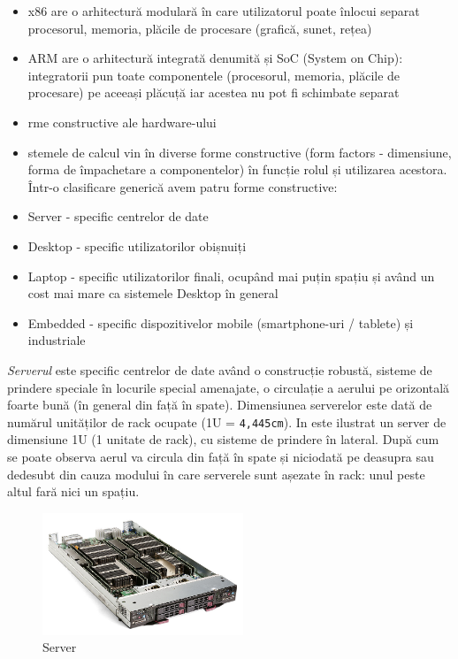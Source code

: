 \begin{itemize}
	\item x86 are o arhitectură modulară în care utilizatorul poate înlocui
		separat procesorul, memoria, plăcile de procesare (grafică,
		sunet, rețea)
	\item ARM are o arhitectură integrată denumită și SoC (System on Chip):
		integratorii pun toate componentele (procesorul, memoria,
		plăcile de procesare) pe aceeași plăcuță iar acestea nu pot fi
		schimbate separat
	\item rme constructive ale hardware-ului
	\item stemele de calcul vin în diverse forme constructive (form factors
		- dimensiune, forma de împachetare a componentelor) în funcție
		rolul și utilizarea acestora. Într-o clasificare generică avem
		patru forme constructive:
	\item Server - specific centrelor de date
	\item Desktop - specific utilizatorilor obișnuiți
	\item Laptop - specific utilizatorilor finali, ocupând mai puțin spațiu
		și având un cost mai mare ca sistemele Desktop în general
	\item Embedded - specific dispozitivelor mobile (smartphone-uri /
		tablete) și industriale
\end{itemize}

\textit{Serverul} este specific centrelor de date având o construcție robustă,
sisteme de prindere speciale în locurile special amenajate, o circulație a
aerului pe orizontală foarte bună (în general din față în spate). Dimensiunea
serverelor este dată de numărul unităților de rack ocupate (1U = \texttt{4,445cm}). In
 este ilustrat un server de dimensiune 1U
(1 unitate de rack), cu sisteme de prindere în lateral. După cum se poate
observa aerul va circula din față în spate și niciodată pe deasupra sau dedesubt
din cauza modului în care serverele sunt așezate în rack: unul peste altul fară
nici un spațiu.

\begin{figure}[!htbp]
	\centering
	\includegraphics[width=6cm]{chapters/08-hw/img/server-img.png}
	\caption{Server\protect\footnotemark}
	\label{fig:hw-server}
\end{figure}

